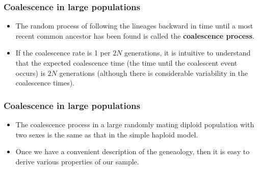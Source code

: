 \documentclass{beamer}
\newcommand{\1}{\ensuremath{\mathbf{1}}}
\begin{document}
%
%
%
\begin{frame}\frametitle{Coalescence in large populations}
	\begin{itemize}
		\item The random process of following the lineages backward in time until a most recent common ancestor has been found is called the \textbf{coalescence process}.
		\item If the coalescence rate is 1 per $2N$ generations, it is intuitive to understand that the expected coalescence time (the time until the coalescent event occurs) is $2N$ generations (although there is considerable variability in the coalescence times).
	\end{itemize}
\end{frame}
%
%
%
\begin{frame}\frametitle{Coalescence in large populations}
	\begin{itemize}
		\item The coalescence process in a large randomly mating diploid population with two sexes is the same as that in the simple haploid model.
		\item Once we have a convenient description of the geneaology, then it is easy to derive various properties of our sample.
	\end{itemize}
\end{frame}
%
%
%
\end{document}
